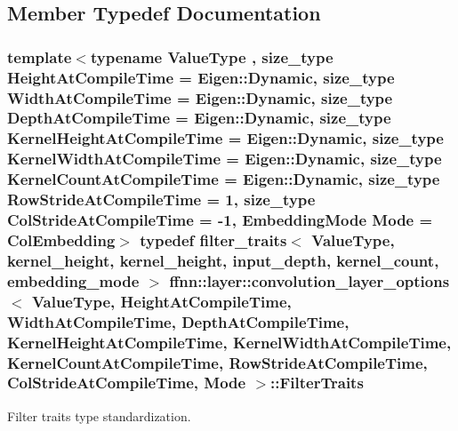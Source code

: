\subsection{Member Typedef Documentation}
\hypertarget{structffnn_1_1layer_1_1convolution__layer__options_a1677fcd2e770f3511589468a702c744e}{
\subsubsection[{Filter\-Traits}]{\setlength{\rightskip}{0pt plus 5cm}template$<$typename Value\-Type , size\-\_\-type Height\-At\-Compile\-Time = Eigen\-::\-Dynamic, size\-\_\-type Width\-At\-Compile\-Time = Eigen\-::\-Dynamic, size\-\_\-type Depth\-At\-Compile\-Time = Eigen\-::\-Dynamic, size\-\_\-type Kernel\-Height\-At\-Compile\-Time = Eigen\-::\-Dynamic, size\-\_\-type Kernel\-Width\-At\-Compile\-Time = Eigen\-::\-Dynamic, size\-\_\-type Kernel\-Count\-At\-Compile\-Time = Eigen\-::\-Dynamic, size\-\_\-type Row\-Stride\-At\-Compile\-Time = 1, size\-\_\-type Col\-Stride\-At\-Compile\-Time = -\/1, Embedding\-Mode Mode = Col\-Embedding$>$ typedef filter\-\_\-traits$<$ Value\-Type, {\bf kernel\-\_\-height}, {\bf kernel\-\_\-height}, {\bf input\-\_\-depth}, {\bf kernel\-\_\-count}, {\bf embedding\-\_\-mode} $>$ {\bf ffnn\-::layer\-::convolution\-\_\-layer\-\_\-options}$<$ Value\-Type, Height\-At\-Compile\-Time, Width\-At\-Compile\-Time, Depth\-At\-Compile\-Time, Kernel\-Height\-At\-Compile\-Time, Kernel\-Width\-At\-Compile\-Time, Kernel\-Count\-At\-Compile\-Time, Row\-Stride\-At\-Compile\-Time, Col\-Stride\-At\-Compile\-Time, Mode $>$\-::{\bf Filter\-Traits}}}\label{structffnn_1_1layer_1_1convolution__layer__options_a1677fcd2e770f3511589468a702c744e}


Filter traits type standardization. 

